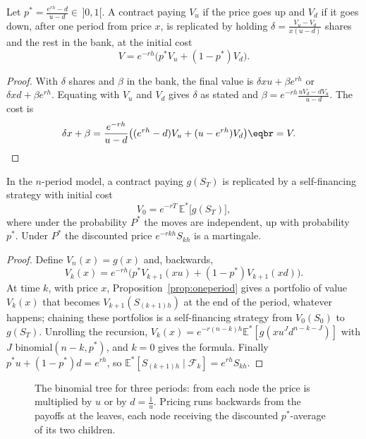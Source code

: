 \begin{proposition}\label{prop:oneperiod}
Let $p^*=\frac{e^{rh}-d}{u-d}\in\,]0,1[$. A contract paying $V_u$ if the price goes up and $V_d$ if it goes down, after one period from price $x$, is replicated by
holding $\delta=\frac{V_u-V_d}{x(u-d)}$ shares and the rest in the bank, at the initial cost
\[
V=e^{-rh}\bigl(p^*V_u+(1-p^*)V_d\bigr).
\]
\end{proposition}
\begin{proof}
With $\delta$ shares and $\beta$ in the bank, the final value is $\delta xu+\beta e^{rh}$ or $\delta xd+\beta e^{rh}$. Equating with $V_u$ and $V_d$ gives $\delta$ as stated and
$\beta=e^{-rh}\frac{uV_d-dV_u}{u-d}$. The cost is
\[
\begin{aligned}\delta x+\beta&=\frac{e^{-rh}}{u-d}\bigl((e^{rh}-d)V_u+(u-e^{rh})V_d\bigr)\eqbr=V.\end{aligned}
\]
\end{proof}

\begin{theorem}\label{thm:binomial}
In the $n$-period model, a contract paying $g(S_T)$ is replicated by a self-financing strategy with initial cost
\[
V_0=e^{-rT}\,\mathbb E^*\bigl[g(S_T)\bigr],
\]
where under the probability $P^*$ the moves are independent, up with probability $p^*$. Under $P^*$ the discounted price $e^{-rkh}S_{kh}$ is a martingale.
\end{theorem}
\begin{proof}
Define $V_n(x)=g(x)$ and, backwards,
\[
V_k(x)=e^{-rh}\bigl(p^*V_{k+1}(xu)+(1-p^*)V_{k+1}(xd)\bigr).
\]
At time $k$, with price $x$, Proposition~\ref{prop:oneperiod} gives a portfolio of value $V_k(x)$
that becomes $V_{k+1}(S_{(k+1)h})$ at the end of the period, whatever happens; chaining these portfolios is a self-financing strategy from
$V_0(S_0)$ to $g(S_T)$. Unrolling the recursion, $V_k(x)=e^{-r(n-k)h}\mathbb E^*[g(xu^Jd^{n-k-J})]$ with $J$ binomial$(n-k,p^*)$, and $k=0$ gives the formula. Finally
$p^*u+(1-p^*)d=e^{rh}$, so $\mathbb E^*[S_{(k+1)h}\mid\mathcal F_k]=e^{rh}S_{kh}$.
\end{proof}

\begin{figure}[ht]
\centering
{}
\caption{The binomial tree for three periods: from each node the price is multiplied by $u$ or by $d=\frac1u$. Pricing runs
backwards from the payoffs at the leaves, each node receiving the discounted $p^*$-average of its two children.}
\label{fig:tree}
\end{figure}

